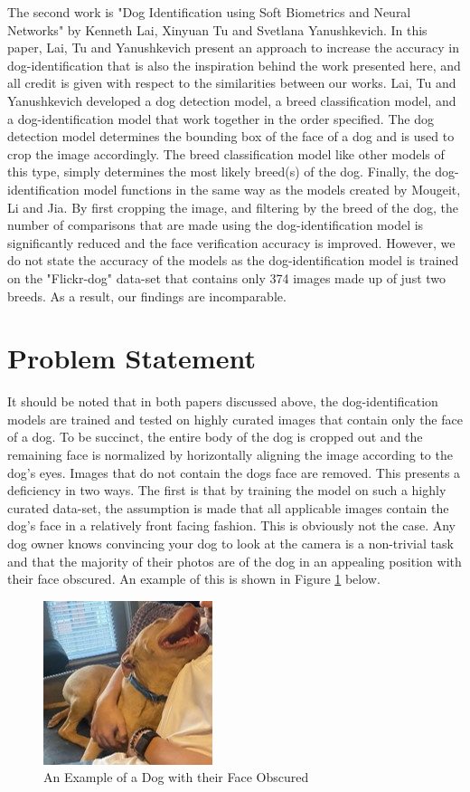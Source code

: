 \documentclass{article}
\begin{document}
	The second work is "Dog Identification using Soft Biometrics and Neural Networks" \cite{LaiKenneth2019DIuS} by Kenneth Lai, Xinyuan Tu and Svetlana Yanushkevich.  In this paper, Lai, Tu and Yanushkevich present an approach to increase the accuracy in dog-identification that is also the inspiration behind the work presented here, and all credit is given with respect to the similarities between our works.  Lai, Tu and Yanushkevich developed a dog detection model, a breed classification model, and a dog-identification model that work together in the order specified.   The dog detection model determines the bounding box of the face of a dog and is used to crop the image accordingly.  The breed classification model like other models of this type, simply determines the most likely breed(s) of the dog.  Finally, the dog-identification model functions in the same way as the models created by Mougeit, Li and Jia.  By first cropping the image, and filtering by the breed of the dog, the number of comparisons that are made using the dog-identification model is significantly reduced and the face verification accuracy is improved.  However, we do not state the accuracy of the models as the dog-identification model is trained on the "Flickr-dog" \cite{LaiKenneth2019DIuS} data-set that contains only 374 images made up of just two breeds.  As a result, our findings are incomparable.

\section{Problem Statement}
	It should be noted that in both papers discussed above, the dog-identification models are trained and tested on highly curated images that contain only the face of a dog.  To be succinct, the entire body of the dog is cropped out and the remaining face is normalized by horizontally aligning the image according to the dog's eyes.  Images that do not contain the dogs face are removed.  This presents a deficiency in two ways.  The first is that by training the model on such a highly curated data-set, the assumption is made that all applicable images contain the dog's face in a relatively front facing fashion.  This is obviously not the case.  Any dog owner knows convincing your dog to look at the camera is a non-trivial task and that the majority of their photos are of the dog in an appealing position with their face obscured.  An example of this is shown in Figure \ref{fig:x dog no face} below.  


\begin{figure}[h]
\centering
	\includegraphics{final-report-images/nofacedog.jpg}
\caption{An Example of a Dog with their Face Obscured}
\label{fig:x dog no face}
\end{figure}
\newpage
\end{document}
